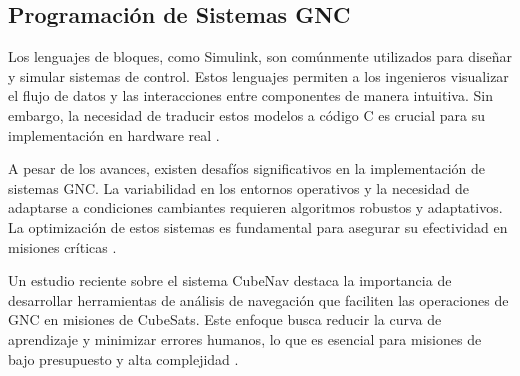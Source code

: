 \subsection{Programación de Sistemas GNC}
Los lenguajes de bloques, como Simulink, son comúnmente utilizados para diseñar y simular sistemas de control. Estos lenguajes permiten a los ingenieros visualizar el flujo de datos y las interacciones entre componentes de manera intuitiva. Sin embargo, la necesidad de traducir estos modelos a código C es crucial para su implementación en hardware real \cite{ardaens2015integrated}.

A pesar de los avances, existen desafíos significativos en la implementación de sistemas GNC. La variabilidad en los entornos operativos y la necesidad de adaptarse a condiciones cambiantes requieren algoritmos robustos y adaptativos. La optimización de estos sistemas es fundamental para asegurar su efectividad en misiones críticas \cite{tafazoli1998efficient}.

Un estudio reciente sobre el sistema CubeNav destaca la importancia de desarrollar herramientas de análisis de navegación que faciliten las operaciones de GNC en misiones de CubeSats. Este enfoque busca reducir la curva de aprendizaje y minimizar errores humanos, lo que es esencial para misiones de bajo presupuesto y alta complejidad \cite{Loureno2023VerificationV}.